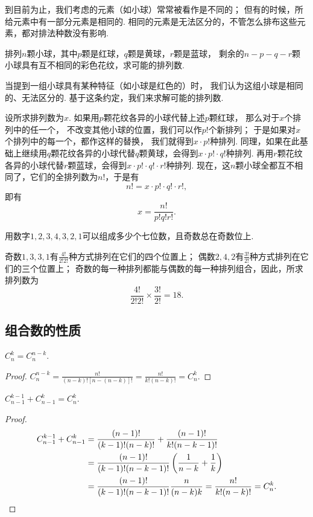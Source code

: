 到目前为止，我们考虑的元素（如小球）常常被看作是不同的；
但有的时候，所给元素中有一部分元素是相同的.
相同的元素是无法区分的，不管怎么排布这些元素，都对排法种数没有影响.

\begin{example}
排列\(n\)颗小球，其中\(p\)颗是红球，\(q\)颗是黄球，\(r\)颗是蓝球，
剩余的\(n-p-q-r\)颗小球具有互不相同的彩色花纹，求可能的排列数.
\begin{solution}
当提到一组小球具有某种特征（如小球是红色的）时，
我们认为这组小球是相同的、无法区分的.
基于这条约定，我们来求解可能的排列数.

设所求排列数为\(x\).
如果用\(p\)颗花纹各异的小球代替上述\(p\)颗红球，
那么对于\(x\)个排列中的任一个，
不改变其他小球的位置，我们可以作\(p!\)个新排列；
于是如果对\(x\)个排列中的每一个，都作这样的替换，
我们就得到\(x \cdot p!\)种排列.
同理，如果在此基础上继续用\(q\)颗花纹各异的小球代替\(q\)颗黄球，会得到\(x \cdot p! \cdot q!\)种排列.
再用\(r\)颗花纹各异的小球代替\(r\)颗蓝球，会得到\(x \cdot p! \cdot q! \cdot r!\)种排列.
现在，这\(n\)颗小球全都互不相同了，它们的全排列数为\(n!\)，于是有\[
	n! = x \cdot p! \cdot q! \cdot r!,
\]即有\[
	x = \frac{n!}{p! q! r!}.
\]
\end{solution}
\end{example}

\begin{example}
用数字\(1,2,3,4,3,2,1\)可以组成多少个七位数，且奇数总在奇数位上.
\begin{solution}
奇数\(1,3,3,1\)有\(\frac{4!}{2! 2!}\)种方式排列在它们的四个位置上；
偶数\(2,4,2\)有\(\frac{3!}{2!}\)种方式排列在它们的三个位置上；
奇数的每一种排列都能与偶数的每一种排列组合，因此，所求排列数为\[
	\frac{4!}{2! 2!} \times \frac{3!}{2!} = 18.
\]
\end{solution}
\end{example}

\subsection{组合数的性质}
\begin{property}\label{theorem:组合数性质1}
\(C_n^k = C_n^{n-k}\).
\begin{proof}
\(
\displaystyle
C_n^{n-k}
= \frac{n!}{(n-k)! [n-(n-k)]!}
= \frac{n!}{k! (n-k)!}
= C_n^k
\).
\end{proof}
\end{property}

\begin{property}\label{theorem:组合数性质2}
\(C_{n-1}^{k-1} + C_{n-1}^k = C_n^k\).
\begin{proof}
\begin{align*}
C_{n-1}^{k-1} + C_{n-1}^k
&= \frac{(n-1)!}{(k-1)! (n-k)!} + \frac{(n-1)!}{k! (n-k-1)!} \\
&= \frac{(n-1)!}{(k-1)! (n-k-1)!} \left( \frac{1}{n-k} + \frac{1}{k} \right) \\
&= \frac{(n-1)!}{(k-1)! (n-k-1)!} \frac{n}{(n-k)k}
= \frac{n!}{k! (n-k)!}
= C_n^k. \qedhere
\end{align*}
\end{proof}
\end{property}

